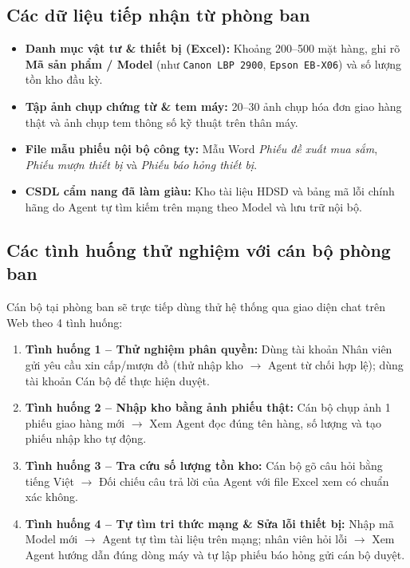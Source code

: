 \documentclass[11pt,a4paper]{article}
\begin{document}
\subsection{Các dữ liệu tiếp nhận từ phòng ban}
\begin{itemize}
    \item \textbf{Danh mục vật tư \& thiết bị (Excel):} Khoảng 200--500 mặt hàng, ghi rõ \textbf{Mã sản phẩm / Model} (như \texttt{Canon LBP 2900}, \texttt{Epson EB-X06}) và số lượng tồn kho đầu kỳ.
    \item \textbf{Tập ảnh chụp chứng từ \& tem máy:} 20--30 ảnh chụp hóa đơn giao hàng thật và ảnh chụp tem thông số kỹ thuật trên thân máy.
    \item \textbf{File mẫu phiếu nội bộ công ty:} Mẫu Word \textit{Phiếu đề xuất mua sắm}, \textit{Phiếu mượn thiết bị} và \textit{Phiếu báo hỏng thiết bị}.
    \item \textbf{CSDL cẩm nang đã làm giàu:} Kho tài liệu HDSD và bảng mã lỗi chính hãng do Agent tự tìm kiếm trên mạng theo Model và lưu trữ nội bộ.
\end{itemize}

\subsection{Các tình huống thử nghiệm với cán bộ phòng ban}
Cán bộ tại phòng ban sẽ trực tiếp dùng thử hệ thống qua giao diện chat trên Web theo 4 tình huống:
\begin{enumerate}
    \item \textbf{Tình huống 1 -- Thử nghiệm phân quyền:} Dùng tài khoản Nhân viên gửi yêu cầu xin cấp/mượn đồ (thử nhập kho $\rightarrow$ Agent từ chối hợp lệ); dùng tài khoản Cán bộ để thực hiện duyệt.
    \item \textbf{Tình huống 2 -- Nhập kho bằng ảnh phiếu thật:} Cán bộ chụp ảnh 1 phiếu giao hàng mới $\rightarrow$ Xem Agent đọc đúng tên hàng, số lượng và tạo phiếu nhập kho tự động.
    \item \textbf{Tình huống 3 -- Tra cứu số lượng tồn kho:} Cán bộ gõ câu hỏi bằng tiếng Việt $\rightarrow$ Đối chiếu câu trả lời của Agent với file Excel xem có chuẩn xác không.
    \item \textbf{Tình huống 4 -- Tự tìm tri thức mạng \& Sửa lỗi thiết bị:} Nhập mã Model mới $\rightarrow$ Agent tự tìm tài liệu trên mạng; nhân viên hỏi lỗi $\rightarrow$ Xem Agent hướng dẫn đúng dòng máy và tự lập phiếu báo hỏng gửi cán bộ duyệt.
\end{enumerate}
\end{document}
